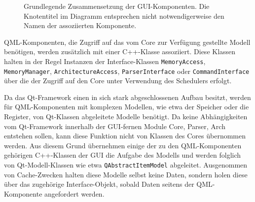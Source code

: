 \begin{figure}[H]
	\begin{center}
	\end{center}
	\caption{Grundlegende Zusammensetzung der GUI-Komponenten. Die Knotentitel im
	Diagramm entsprechen nicht notwendigerweise den Namen der assoziierten
	Komponente.}
	\label{fig:gui-composition}
\end{figure}

QML-Komponenten, die Zugriff auf das vom Core zur Verfügung gestellte Modell
benötigen, werden zusätzlich mit einer C++-Klasse assoziiert. Diese Klassen
halten in der Regel Instanzen der Interface-Klassen \texttt{MemoryAccess},
\texttt{MemoryManager}, \texttt{ArchitectureAccess}, \texttt{ParserInterface}
oder \texttt{CommandInterface}  über die der Zugriff auf den Core unter
Verwendung des Schedulers erfolgt.

Da das Qt-Framework einen in sich stark abgeschlossenen Aufbau besitzt, werden
für QML-Komponenten mit komplexen Modellen, wie etwa der Speicher oder die
Register, von Qt-Klassen abgeleitete Modelle benötigt. Da keine Abhängigkeiten
vom Qt-Framework innerhalb der GUI-fernen Module Core, Parser, Arch entstehen
sollen, kann diese Funktion nicht von Klassen des Cores übernommen werden. Aus
diesem Grund übernehmen einige der zu den QML-Komponenten gehörigen C++-Klassen
der GUI die Aufgabe des Modells und werden folglich von Qt-Modell-Klassen wie
etwa \texttt{QAbstractItemModel} abgeleitet. Ausgenommen von Cache-Zwecken
halten diese Modelle selbst keine Daten, sondern holen diese über das zugehörige
Interface-Objekt, sobald Daten seitens der QML-Komponente angefordert werden.

